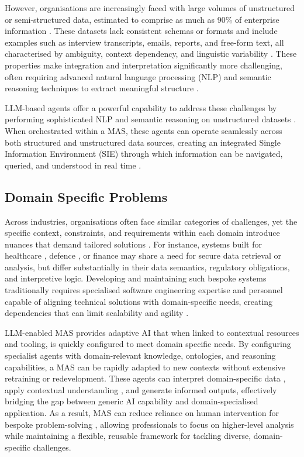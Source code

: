 \documentclass{article}
\begin{document}
However, organisations are increasingly faced with large volumes of unstructured or semi-structured data, estimated to comprise as much as 90\% of enterprise information \cite{muscolino2023untapped}. These datasets lack consistent schemas or formats \cite{tredinnick2024managing} and include examples such as interview transcripts, emails, reports, and free-form text, all characterised by ambiguity, context dependency, and linguistic variability \cite{inmon2007tapping}. These properties make integration and interpretation significantly more challenging, often requiring advanced natural language processing (NLP) and semantic reasoning techniques to extract meaningful structure \cite{gharehchopogh2011analysis, li2022neural}.

LLM-based agents offer a powerful capability to address these challenges by performing sophisticated NLP and semantic reasoning on unstructured datasets \cite{deng2025unstructured}. When orchestrated within a MAS, these agents can operate seamlessly across both structured and unstructured data sources, creating an integrated Single Information Environment (SIE) through which information can be navigated, queried, and understood in real time \cite{li2024llm, renney2025reimagining}.

\subsection{Domain Specific Problems}

Across industries, organisations often face similar categories of challenges, yet the specific context, constraints, and requirements within each domain introduce nuances that demand tailored solutions \cite{mohagheghi2010evaluating}. For instance, systems built for healthcare \cite{arunprasath2024improving}, defence \cite{yuvathasecure}, or finance \cite{Kazmi2025dataregsfinance} may share a need for secure data retrieval or analysis, but differ substantially in their data semantics, regulatory obligations, and interpretive logic. Developing and maintaining such bespoke systems traditionally requires specialised software engineering expertise and personnel capable of aligning technical solutions with domain-specific needs, creating dependencies that can limit scalability and agility \cite{mernik2005and}.

LLM-enabled MAS provides adaptive AI that when linked to contextual resources and tooling, is quickly configured to meet domain specific needs. By configuring specialist agents with domain-relevant knowledge, ontologies, and reasoning capabilities, a MAS can be rapidly adapted to new contexts without extensive retraining or redevelopment. These agents can interpret domain-specific data \cite{aryal2024leveraging}, apply contextual understanding \cite{du2024survey}, and generate informed outputs, effectively bridging the gap between generic AI capability and domain-specialised application. As a result, MAS can reduce reliance on human intervention for bespoke problem-solving \cite{cambon2023early}, allowing professionals to focus on higher-level analysis while maintaining a flexible, reusable framework for tackling diverse, domain-specific challenges.
\end{document}
